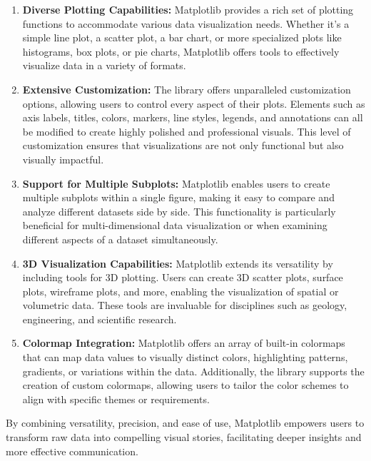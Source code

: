\begin{enumerate}
	\item \textbf{Diverse Plotting Capabilities:} Matplotlib provides a rich set of plotting functions to accommodate various data visualization needs. Whether it’s a simple line plot, a scatter plot, a bar chart, or more specialized plots like histograms, box plots, or pie charts, Matplotlib offers tools to effectively visualize data in a variety of formats.
	
	\item \textbf{Extensive Customization:} The library offers unparalleled customization options, allowing users to control every aspect of their plots. Elements such as axis labels, titles, colors, markers, line styles, legends, and annotations can all be modified to create highly polished and professional visuals. This level of customization ensures that visualizations are not only functional but also visually impactful.
	
	\item \textbf{Support for Multiple Subplots:} Matplotlib enables users to create multiple subplots within a single figure, making it easy to compare and analyze different datasets side by side. This functionality is particularly beneficial for multi-dimensional data visualization or when examining different aspects of a dataset simultaneously.
	
	\item \textbf{3D Visualization Capabilities:} Matplotlib extends its versatility by including tools for 3D plotting. Users can create 3D scatter plots, surface plots, wireframe plots, and more, enabling the visualization of spatial or volumetric data. These tools are invaluable for disciplines such as geology, engineering, and scientific research.
	
	\item \textbf{Colormap Integration:} Matplotlib offers an array of built-in colormaps that can map data values to visually distinct colors, highlighting patterns, gradients, or variations within the data. Additionally, the library supports the creation of custom colormaps, allowing users to tailor the color schemes to align with specific themes or requirements.
\end{enumerate}

By combining versatility, precision, and ease of use, Matplotlib empowers users to transform raw data into compelling visual stories, facilitating deeper insights and more effective communication.


